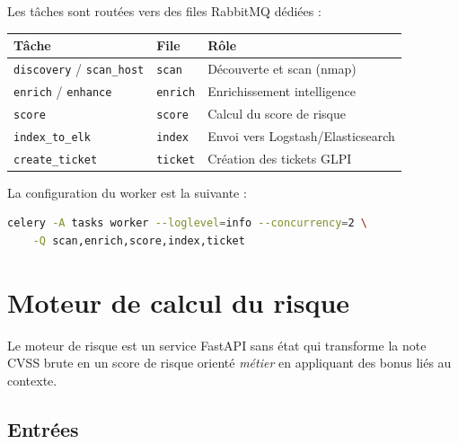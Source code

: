 \documentclass[11pt,a4paper]{article}
\begin{document}
Les t\^aches sont rout\'ees vers des files RabbitMQ d\'edi\'ees :

\begin{center}
\small
\begin{tabularx}{\linewidth}{@{}l l X@{}}
\toprule
\textbf{T\^ache} & \textbf{File} & \textbf{R\^ole} \\
\midrule
\texttt{discovery} / \texttt{scan\_host} & \texttt{scan} & D\'ecouverte et scan (nmap) \\
\texttt{enrich} / \texttt{enhance} & \texttt{enrich} & Enrichissement intelligence \\
\texttt{score} & \texttt{score} & Calcul du score de risque \\
\texttt{index\_to\_elk} & \texttt{index} & Envoi vers Logstash/Elasticsearch \\
\texttt{create\_ticket} & \texttt{ticket} & Cr\'eation des tickets GLPI \\
\bottomrule
\end{tabularx}
\end{center}

La configuration du worker est la suivante :

\begin{lstlisting}[language=bash,caption={Commande du worker Celery}]
celery -A tasks worker --loglevel=info --concurrency=2 \
    -Q scan,enrich,score,index,ticket
\end{lstlisting}

\clearpage

\section{Moteur de calcul du risque}

Le moteur de risque est un service FastAPI sans \'etat qui transforme la note
CVSS brute en un score de risque orient\'e \emph{m\'etier} en appliquant des
bonus li\'es au contexte.

\subsection{Entr\'ees}
\end{document}
